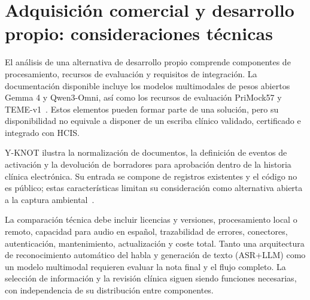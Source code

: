 \clearpage
\section{Adquisición comercial y desarrollo propio: consideraciones técnicas}
\label{app:construir}
El análisis de una alternativa de desarrollo propio comprende componentes de procesamiento, recursos de evaluación y requisitos de integración. La documentación disponible incluye los modelos multimodales de pesos abiertos Gemma 4 y Qwen3-Omni, así como los recursos de evaluación PriMock57 y TEME-v1~\cite{J4955P47,P9P5U4KE,G2L7QBIV,CMRQCQTY}. Estos elementos pueden formar parte de una solución, pero su disponibilidad no equivale a disponer de un escriba clínico validado, certificado e integrado con HCIS.

Y-KNOT ilustra la normalización de documentos, la definición de eventos de activación y la devolución de borradores para aprobación dentro de la historia clínica electrónica. Su entrada se compone de registros existentes y el código no es público; estas características limitan su consideración como alternativa abierta a la captura ambiental~\cite{QQCRZ7VX}.

La comparación técnica debe incluir licencias y versiones, procesamiento local o remoto, capacidad para audio en español, trazabilidad de errores, conectores, autenticación, mantenimiento, actualización y coste total. Tanto una arquitectura de reconocimiento automático del habla y generación de texto (ASR+LLM) como un modelo multimodal requieren evaluar la nota final y el flujo completo. La selección de información y la revisión clínica siguen siendo funciones necesarias, con independencia de su distribución entre componentes.


\printbibliography[heading=subbibliography,title={Referencias técnicas},keyword=tecnica]
